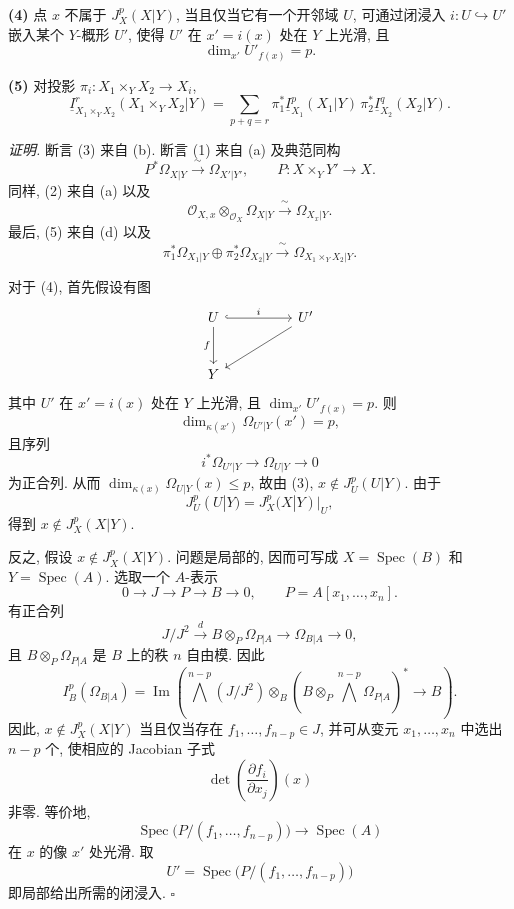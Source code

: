 \smallskip
\noindent\textbf{(4)} 点 $x$ 不属于 $J_X^p(X|Y)$, 当且仅当它有一个开邻域 $U$, 可通过闭浸入 $i:U\hookrightarrow U'$ 嵌入某个 $Y$-概形 $U'$, 使得 $U'$ 在 $x'=i(x)$ 处在 $Y$ 上光滑, 且
\[
\dim_{x'}U'_{f(x)}=p.
\]

\smallskip
\noindent\textbf{(5)} 对投影 $\pi_i:X_1\times_YX_2\longrightarrow X_i$,
\[
\underline I_{X_1\times_YX_2}^r(X_1\times_YX_2|Y)
=\sum_{p+q=r}
 \pi_1^*\underline I_{X_1}^p(X_1|Y)\,
 \pi_2^*\underline I_{X_2}^q(X_2|Y).
\]

\smallskip
\noindent\textit{证明.}
断言 (3) 来自 (b). 断言 (1) 来自 (a) 及典范同构
\[
P^*\Omega_{X|Y}\xrightarrow{\ \sim\ }\Omega_{X'|Y'},
\qquad P:X\times_YY'\longrightarrow X.
\]
同样, (2) 来自 (a) 以及
\[
\mathcal O_{X,x}\otimes_{\mathcal O_X}\Omega_{X|Y}
\xrightarrow{\ \sim\ }\Omega_{X_x|Y}.
\]
最后, (5) 来自 (d) 以及
\[
\pi_1^*\Omega_{X_1|Y}\oplus\pi_2^*\Omega_{X_2|Y}
\xrightarrow{\ \sim\ }
\Omega_{X_1\times_YX_2|Y}.
\]

对于 (4), 首先假设有图
\[
\begin{tikzcd}[column sep=huge,row sep=large]
U \arrow[r,hook,"i"] \arrow[d,"f"']
  & U' \arrow[dl] \\
Y & {}
\end{tikzcd}
\]
其中 $U'$ 在 $x'=i(x)$ 处在 $Y$ 上光滑, 且 $\dim_{x'}U'_{f(x)}=p$. 则
\[
\dim_{\kappa(x')}\Omega_{U'|Y}(x')=p,
\]
且序列
\[
i^*\Omega_{U'|Y}\longrightarrow\Omega_{U|Y}\longrightarrow0
\]
为正合列. 从而 $\dim_{\kappa(x)}\Omega_{U|Y}(x)\leq p$, 故由 (3), $x\notin J_U^p(U|Y)$. 由于
\[
J_U^p(U|Y)=J_X^p(X|Y)|_U,
\]
得到 $x\notin J_X^p(X|Y)$.


反之, 假设 $x\notin J_X^p(X|Y)$. 问题是局部的, 因而可写成 $X=\operatorname{Spec}(B)$ 和 $Y=\operatorname{Spec}(A)$. 选取一个 $A$-表示
\[
0\longrightarrow J\longrightarrow P\longrightarrow B
\longrightarrow0,
\qquad P=A[x_1,\ldots,x_n].
\]
有正合列
\[
J/J^2\xrightarrow{d}B\otimes_P\Omega_{P|A}
\longrightarrow\Omega_{B|A}\longrightarrow0,
\]
且 $B\otimes_P\Omega_{P|A}$ 是 $B$ 上的秩 $n$ 自由模. 因此
\[
I_B^p(\Omega_{B|A})
=\operatorname{Im}\left(
 \bigwedge^{n-p}(J/J^2)\otimes_B
 (B\otimes_P\bigwedge^{n-p}\Omega_{P|A})^*
 \longrightarrow B\right).
\]
因此, $x\notin J_X^p(X|Y)$ 当且仅当存在 $f_1,\ldots,f_{n-p}\in J$, 并可从变元 $x_1,\ldots,x_n$ 中选出 $n-p$ 个, 使相应的 Jacobian 子式
\[
\det\left(\frac{\partial f_i}{\partial x_j}\right)(x)
\]
非零. 等价地,
\[
\operatorname{Spec}\bigl(P/(f_1,\ldots,f_{n-p})\bigr)
\longrightarrow\operatorname{Spec}(A)
\]
在 $x$ 的像 $x'$ 处光滑. 取
\[
U'=\operatorname{Spec}\bigl(P/(f_1,\ldots,f_{n-p})\bigr)
\]
即局部给出所需的闭浸入. \hfill$\square$


